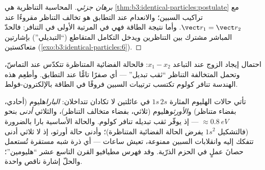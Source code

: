 \begin{proof}[برهان جزئي]
المحاسبة التناظرية هي
\cref{thm:b3:identical-particles:postulate} مع تراكيب
السبين؛ والانعدام عند التطابق هو تخالف التناظر مقروءًا عند
$\vect r_1 = \vect r_2$. وأما نتيجة الطاقة فهي 
في المرتبة الأولى في التنافر: فالحدّ المباشر مشترك بين
التناظرين ويدخل التكامل المتقاطع (``التبديلي'') بإشارتين
متعاكستين (\cref{exo:b3:identical-particles:6}).
\end{proof}

\begin{omfigure}

{\small احتمال إيجاد الزوج عند التباعد $x_1 - x_2$:
فالحالة الفضائية المتناظرة تتكدّس عند التماسّ، وتحمل المتخالفة
التناظر ``ثقب تبديل'' --- أي صفرًا تامًّا عند التطابق.
وأطعِم هذه الهندسة تنافر كولوم تكتسب ترتيبات السبين
فروقًا في الطاقة بالإلكترون-فولط.}
\end{omfigure}

\begin{example}\label{ex:b3:identical-particles:helium}
تأتي حالات الهليوم المثارة $1s\,2s$ في عائلتين لا تكادان
تتداخلان: \emph{البارا}هليوم (أحادي، بفضاء متناظر) و\emph{الأورثو}هليوم
(ثلاثي، بفضاء متخالف التناظر)، والثلاثي \emph{أدنى}
بنحو $\approx\qty{0.8}{eV}$ --- إذ يوفّر ثقب تبديله
تنافر كولوم. والحالة الأساسية بارا بالضرورة (فالتشكيل $1s^2$
يفرض الحالة الفضائية المتناظرة)؛ وأدنى حالة أورثو،
إذ لا ثلاثي أدنى تتفكك إليه وانقلابات السبين ممنوعة، تعيش
ساعات --- أي ذرة شبه مستقرة تُستعمل حصانَ عملٍ في الحزم
الذرّية. وقد فهرس مطيافيو القرن التاسع عشر ``هليومين''؛
والحلّ إشارة ناقص واحدة.
\end{example}


